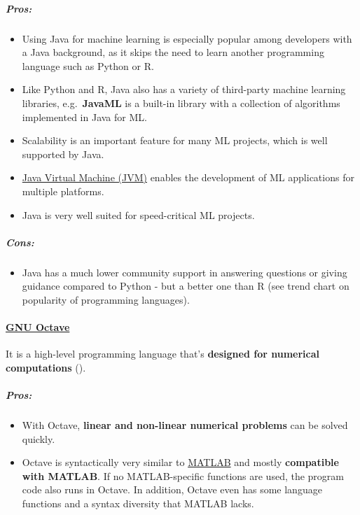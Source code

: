 \documentclass [oneside,10pt,a4paper,ngerman,BCOR10mm,headsepline,parindent,final]{scrartcl}
\providecommand{\tightlist}{%
      \setlength{\itemsep}{0pt}\setlength{\parskip}{0pt}}
\begin{document}
\hypertarget{pros}{%
\subparagraph{Pros:}\label{pros}}

\begin{itemize}
\tightlist
\item
  Using Java for machine learning is especially popular among developers
  with a Java background, as it skips the need to learn another
  programming language such as Python or R.
\item
  Like Python and R, Java also has a variety of third-party machine
  learning libraries, e.g.~\textbf{JavaML} is a built-in library with a
  collection of algorithms implemented in Java for ML.
\item
  Scalability is an important feature for many ML projects, which is
  well supported by Java.
\item
  \href{https://en.wikipedia.org/wiki/Java_virtual_machine}{Java Virtual
  Machine (JVM)} enables the development of ML applications for multiple
  platforms.
\item
  Java is very well suited for speed-critical ML projects.
\end{itemize}

\hypertarget{cons}{%
\subparagraph{Cons:}\label{cons}}

\begin{itemize}
\tightlist
\item
  Java has a much lower community support in answering questions or
  giving guidance compared to Python - but a better one than R (see
  trend chart on popularity of programming languages).
\end{itemize}

    \hypertarget{gnu-octave}{%
\paragraph{\texorpdfstring{\href{https://en.wikipedia.org/wiki/GNU_Octave}{GNU
Octave}}{GNU Octave}}\label{gnu-octave}}

It is a high-level programming language that's \textbf{designed for
numerical computations} (\cite{Octave_for_ML_2021}).

\hypertarget{pros}{%
\subparagraph{Pros:}\label{pros}}

\begin{itemize}
\tightlist
\item
  With Octave, \textbf{linear and non-linear numerical problems} can be
  solved quickly.
\item
  Octave is syntactically very similar to
  \href{https://en.wikipedia.org/wiki/MATLAB}{MATLAB} and mostly
  \textbf{compatible with MATLAB}. If no MATLAB-specific functions are
  used, the program code also runs in Octave. In addition, Octave even
  has some language functions and a syntax diversity that MATLAB lacks.
\end{itemize}
\end{document}
